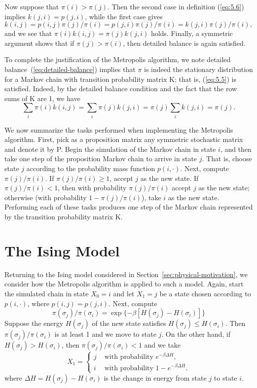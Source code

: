 Now suppose that $\pi(i) > \pi(j)$. Then the second case in definition (\ref{eq:5.6}) implies
$k(j,i) =p(j,i)$, while the first case gives
\[
k(i,j) = p(i,j)\pi(j)/\pi(i) =  p(j,i)\pi(j)/\pi(i) = k(j,i)\pi(j)/\pi(i),
\]
and we see that 
$\pi(i)k(i,j) = \pi(j)k(j,i)$ holds.
Finally, a symmetric argument shows that if $\pi(j) > \pi(i)$,
then detailed balance is again satisfied.

To complete the justification of the Metropolis algorithm, we note
detailed balance~(\ref{eq:detailed-balance})
implies that $\pi$ is indeed the stationary distribution for a Markov 
chain with transition probability matrix K; that is, (\ref{eq:5.5}) is
satisfied. Indeed, by the detailed balance condition and the fact that
the row sums of K are 1, we have
\begin{equation*}
\sum_i \pi(i)k(i,j)
=\sum_i \pi(j)k(j,i)
=\pi(j)\sum_i k(j,i)
 = \pi(j).
\end{equation*}


We now summarize the tasks performed when implementing the Metropolis algorithm.
First, pick as a proposition matrix any symmetric stochastic matrix and denote
it by P. Begin 
%
%
%
the simulation of the Markov chain in state $i$, and then take one step of the
proposition Markov chain to arrive in state $j$. That is, choose state $j$
according to the probability mass function $p(i, \cdot)$. 
Next, compute $\pi(j)/\pi(i)$. 
If $\pi(j)/\pi(i) \geq 1$, accept $j$ as the new state. If $\pi(j)/\pi(i) < 1$,
then with probability $\pi(j)/\pi(i)$ accept $j$ as the new state; otherwise
(with probability $1- \pi(j)/\pi(i)$), take $i$ as the new state. Performing
each of these tasks produces one step of the Markov chain represented by the 
transition probability matrix K.


\section{The Ising Model}
\label{sec:ising-model}
Returning to the Ising model considered in
Section~\ref{sec:physical-motivation}, we consider how the Metropolis 
algorithm is applied to such a model. Again, start the simulated chain in state
$X_0 = i$ and let $X_1 = j$ be a state chosen according to 
$p(i, \cdot)$, where $p(i,j) = p(j,i)$. Next, compute 
\[
\pi(\sigma_j)/\pi(\sigma_i) = \exp\{-\beta[H(\sigma_j) - H(\sigma_i)]\}
\]
Suppose the energy $H(\sigma_j)$ of the new state satisfies 
$H(\sigma_j) \leq H(\sigma_i)$.
Then $\pi(\sigma_j)/\pi(\sigma_i)$ is at least 1 and we move to state $j$.
On the other hand, if
$H(\sigma_j) > H(\sigma_i)$,
then $\pi(\sigma_j)/\pi(\sigma_i)< 1$ and we take
\begin{equation}
\label{eq:5.8}
X_1 = 
\begin{cases}
j & \text{ with probability $e^{-\beta\Delta H}$},\\
i & \text{ with probability $1-e^{-\beta\Delta H}$}.
\end{cases}
\end{equation}
where $\Delta H = H(\sigma_j) - H(\sigma_i)$ is the change in energy from state $j$ to state $i$.

